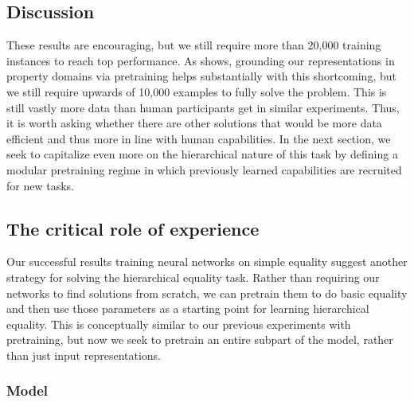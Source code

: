 \documentclass[9pt,twocolumn,twoside,lineno]{pnas-new}
\newcommand{\update}[1]{{\color{darkblue}#1}}
\begin{document}
\subsection*{Discussion}

These results are encouraging, but we still require more than 20,000 training instances to reach top performance. \update{As  shows, grounding our representations in property domains via pretraining helps substantially with this shortcoming, but we still require upwards of 10,000 examples to fully solve the problem. This is still vastly more data than human participants get in similar experiments.}  Thus, it is worth asking whether there are other solutions that would be more data efficient and thus more in line with human capabilities.  In the next section, we seek to capitalize even more on the hierarchical nature of this task by defining a modular pretraining regime in which previously learned capabilities are recruited for new tasks.


\subsection*{The critical role of experience}\label{sec:modular}

Our successful results training neural networks on simple equality suggest another strategy for solving the hierarchical equality task. Rather than requiring our networks to find solutions from scratch, we can pretrain them to do basic equality and then use those parameters as a starting point for learning hierarchical equality. \update{This is conceptually similar to our previous experiments with pretraining, but now we seek to pretrain an entire subpart of the model, rather than just input representations.}


\subsubsection*{Model}
\end{document}
